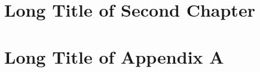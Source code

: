   
   
   
   

   \chapter[%
      Short Title of 2nd Ch.
   ]{%
      Long Title of Second Chapter
   }%
   \label{ch:2ndChapterLabel}
   
   
   \appendix

   \chapter[%
      Short Title of Appendix A
   ]{%
      Long Title of Appendix A
   }%
   \label{ch:AppendixALabel}
   
       
   \backmatter
   
   
   
